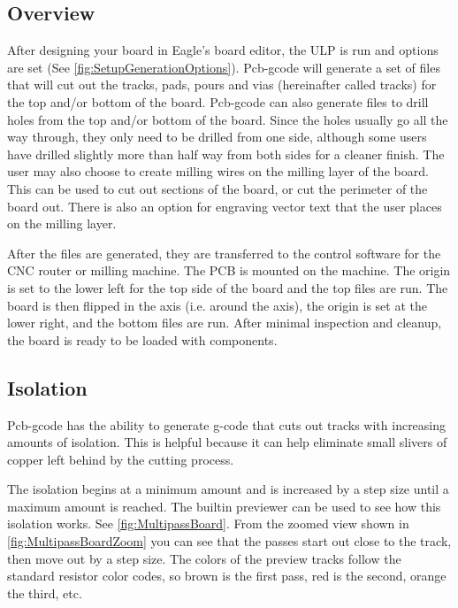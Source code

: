 \documentclass[11pt]{book}
\begin{document}
\subsection{Overview}
After designing your board in Eagle's board editor, the ULP  is run and options are set (See \figurename \vref{fig:SetupGenerationOptions}). Pcb-gcode will generate a set of files that will cut out the tracks, pads, pours and vias (hereinafter called tracks) for the top and/or bottom of the board. Pcb-gcode can also generate files to drill holes from the top and/or bottom of the board. Since the holes usually go all the way through, they only need to be drilled from one side, although some users have drilled slightly more than half way from both sides for a cleaner finish. The user may also choose to create milling wires on the milling layer of the board. This can be used to cut out sections of the board, or cut the perimeter of the board out. There is also an option for engraving vector text that the user places on the milling layer.

After the files are generated, they are transferred to the control software for the CNC router or milling machine. The PCB is mounted on the machine. The origin is set to the lower left for the top side of the board and the top files are run. The board is then flipped in the  axis (i.e. around the  axis), the origin is set at the lower right, and the bottom files are run. After minimal inspection and cleanup, the board is ready to be loaded with components.

\subsection{Isolation}
Pcb-gcode has the ability to generate g-code that cuts out tracks with increasing amounts of isolation. This is helpful because it can help eliminate small slivers of copper left behind by the cutting process.

The isolation begins at a minimum amount and is increased by a step size until a maximum amount is reached. The builtin previewer can be used to see how this isolation works. See \figurename \vref{fig:MultipassBoard}. From the zoomed view shown in \figurename \vref{fig:MultipassBoardZoom} you can see that the passes start out close to the track, then move out by a step size. The colors of the preview tracks follow the standard resistor color codes, so brown is the first pass, red is the second, orange the third, etc.
\end{document}
